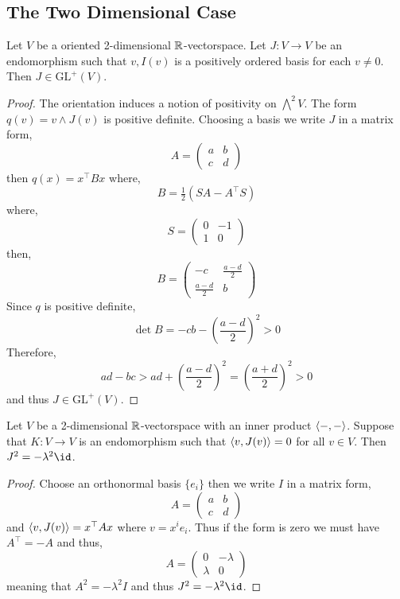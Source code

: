 \documentclass[12pt]{article}
\begin{document}
\subsection{The Two Dimensional Case}


\begin{lemma}
Let $V$ be a oriented 2-dimensional $\mathbb{R}$-vectorspace. Let $J : V \to V$ be an endomorphism such that $v, I(v)$ is a positively ordered basis for each $v \neq 0$. Then $J \in \mathrm{GL}^{+}(V)$.
\end{lemma}


\begin{proof}
The orientation induces a notion of positivity on $\bigwedge^2 V$. The form $q(v) = v \wedge J(v)$ is positive definite. Choosing a basis we write $J$ in a matrix form,
\[ A = 
\begin{pmatrix}
a & b 
\\
c & d 
\end{pmatrix} \]
then $q(x) = x^\top B x$ where,
\[ B = \tfrac{1}{2} (SA - A^\top S) \]
where,
\[ S = 
\begin{pmatrix}
0 & -1
\\
1 & 0
\end{pmatrix} \]
then,
\[ B = 
\begin{pmatrix}
-c & \frac{a-d}{2}
\\
\frac{a-d}{2} & b 
\end{pmatrix} \]
Since $q$ is positive definite,
\[ \det{B} = -cb - \left( \frac{a-d}{2} \right)^2 > 0 \]
Therefore,
\[ ad - bc > ad + \left( \frac{a-d}{2} \right)^2 = \left( \frac{a + d}{2} \right)^2 > 0 \]
and thus $J \in \mathrm{GL}^{+}(V)$.
\end{proof}

\begin{lemma}
Let $V$ be a 2-dimensional $\mathbb{R}$-vectorspace with an inner product $\left< - , - \right>$. Suppose that $K : V \to V$ is an endomorphism such that $\left< v , J(v) \right> = 0$ for all $v \in V$. Then $J^2 = - \lambda^2 \id$.
\end{lemma}

\begin{proof}
Choose an orthonormal basis $\{ e_i \}$ then we write $I$ in a matrix form,
\[ A = 
\begin{pmatrix}
a & b 
\\
c & d 
\end{pmatrix} \]
and $\left< v , J(v) \right> = x^\top A x$ where $v = x^i e_i$. Thus if the form is zero we must have $A^\top = -A$ and thus,
\[ A = 
\begin{pmatrix}
0 & -\lambda 
\\
\lambda & 0
\end{pmatrix} \]
meaning that $A^2 = - \lambda^2 I$ and thus $J^2 = - \lambda^2 \id$.
\end{proof}
\end{document}
